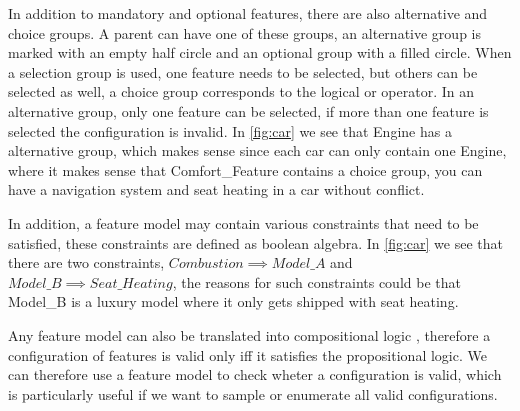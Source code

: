 In addition to mandatory and optional features, there are also alternative and choice groups. A parent can have one of these groups, an alternative group
is marked with an empty half circle and an optional group with a filled circle. When a selection group is used, one feature needs to be selected, but
others can be selected as well, a choice group corresponds to the logical or operator. In an alternative group, only one feature can be
selected, if more than one feature is selected the configuration is invalid. In \ref{fig:car} we see that Engine has a alternative group, which makes sense
since each car can only contain one Engine, where it makes sense that Comfort\_Feature contains a choice group, you can have a navigation system
and seat heating in a car without conflict.

In addition, a feature model may contain various constraints that need to be satisfied, these constraints are defined as boolean 
algebra. In \ref{fig:car} we see that there are two constraints, $Combustion \implies Model\_A$ and 
$Model\_B \implies Seat\_Heating$, the reasons for such constraints could be that Model\_B is a luxury model where it only gets shipped
with seat heating.

Any feature model can also be translated into compositional logic \cite*{Feature-Oriented-Software-Product-Lines-Feature-models}, therefore a
configuration of features is valid only iff it satisfies the propositional logic. We can therefore use a feature model to check wheter a 
configuration is valid, which is particularly useful if we want to sample or enumerate all valid configurations. 